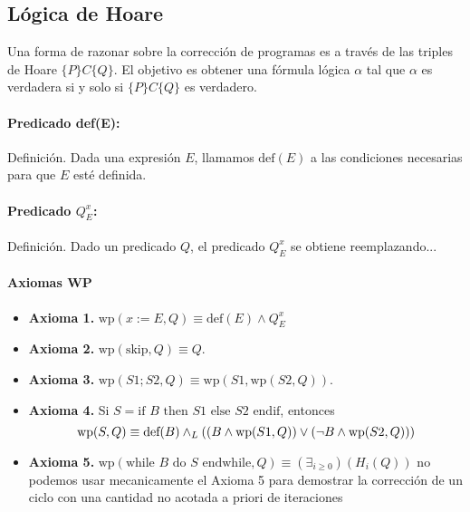 \documentclass[9pt]{extarticle}  %
\newcommand{\smalltable}{\fontsize{8pt}{10pt}\selectfont}
\begin{document}
\subsection*{\tiny{Lógica de Hoare}}
\vspace{-0.3cm}
\noindent\smalltable
\vspace{-0.1cm}
Una forma de razonar sobre la corrección de programas es a través de las triples de Hoare \(\{P\} C \{Q\}\). El objetivo es obtener una fórmula lógica \( \alpha \) tal que \( \alpha \) es verdadera si y solo si \(\{P\} C \{Q\}\) es verdadero.
\vspace{-0.5cm}
\paragraph*{Predicado def(E):}
Definición. Dada una expresión \( E \), llamamos \( \text{def}(E) \) a las condiciones necesarias para que \( E \) esté definida.
\vspace{-0.45cm}
\paragraph*{Predicado \( Q_{E}^x \):}
Definición. Dado un predicado \( Q \), el predicado \( Q_{E}^x \) se obtiene reemplazando...
\vspace{-0.4cm}
\paragraph*{Axiomas WP}
\begin{itemize}\vspace{-0.35cm}
    \item \textbf{Axioma 1.} \( \text{wp}(x := E, Q) \equiv \text{def}(E) \land Q_{E}^x \)\vspace{-0.35cm}
    \item \textbf{Axioma 2.} \( \text{wp}(\text{skip}, Q) \equiv Q \).
    \vspace{-0.33cm}
    \item \textbf{Axioma 3.} \( \text{wp}(S1; S2, Q) \equiv \text{wp}(S1,\text{wp}(S2, Q)) \).\vspace{-0.33cm}
    \item \textbf{Axioma 4.} Si \(S = \text{if } B \text{ then } S1 \text{ else } S2 \text{ endif}\), entonces
    \vspace{-0.31cm}
    \[
    \vspace{-0.37cm}
    \text{wp}(S, Q) \equiv \text{def}(B) \yLuego \left( (B \land \text{wp}(S1, Q)) \vee (\neg B \land \text{wp}(S2, Q)) \right)
    \]
     \item \textbf{Axioma 5.} \( \text{wp}(\text{while } B \text{ do } S \text{ endwhile}, Q) \equiv (\exists_{i \geq 0})({ H_i}(Q)) \)  no podemos usar mecanicamente el Axioma 5
para demostrar la corrección de un ciclo con una cantidad no
acotada a priori de iteraciones
\vspace{-0.34cm}
\end{itemize}
\end{document}

